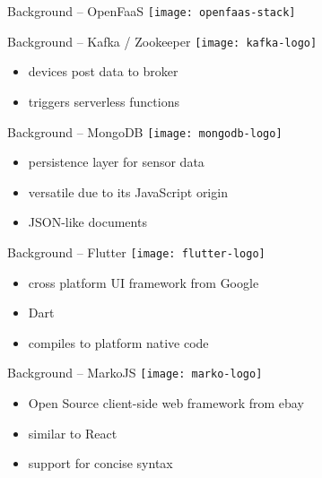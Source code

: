 \documentclass[aspectratio=1610]{beamer}
\begin{document}
  \begin{frame}{Background -- OpenFaaS}
    \texttt{[image: openfaas-stack]}
  \end{frame}

  \begin{frame}{Background -- Kafka / Zookeeper}
    \texttt{[image: kafka-logo]}

    \vspace*{1.5em}

    \begin{itemize}
      \item devices post data to broker
      \item triggers serverless functions
    \end{itemize}
  \end{frame}

  \begin{frame}{Background -- MongoDB}
    \texttt{[image: mongodb-logo]}

    \vspace*{1.5em}

    \begin{itemize}
      \item persistence layer for sensor data
      \item versatile due to its JavaScript origin
      \item JSON-like documents
    \end{itemize}
  \end{frame}

  \begin{frame}{Background -- Flutter}
    \texttt{[image: flutter-logo]}

    \vspace*{2em}

    \begin{itemize}
      \item cross platform UI framework from Google
      \item Dart
      \item compiles to platform native code
    \end{itemize}
  \end{frame}

  \begin{frame}{Background -- MarkoJS}
    \texttt{[image: marko-logo]}

    \vspace*{2em}

    \begin{itemize}
      \item Open Source client-side web framework from ebay
      \item similar to React
      \item support for concise syntax
    \end{itemize}
  \end{frame}
\end{document}
